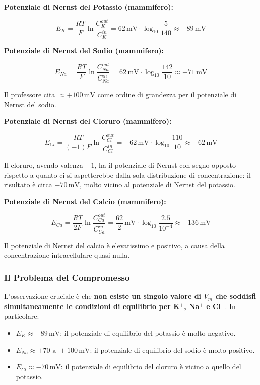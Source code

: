 \textbf{Potenziale di Nernst del Potassio (mammifero):}

\begin{equation}
E_K = \frac{RT}{F} \ln \frac{C_K^{out}}{C_K^{in}} = 62\,\text{mV} \cdot \log_{10}\frac{5}{140} \approx -89\,\text{mV}
\end{equation}

\textbf{Potenziale di Nernst del Sodio (mammifero):}

\begin{equation}
E_{Na} = \frac{RT}{F} \ln \frac{C_{Na}^{out}}{C_{Na}^{in}} = 62\,\text{mV} \cdot \log_{10}\frac{142}{10} \approx +71\,\text{mV}
\end{equation}

Il professore cita $\approx +100\,\text{mV}$ come ordine di grandezza per il potenziale di Nernst del sodio.

\textbf{Potenziale di Nernst del Cloruro (mammifero):}

\begin{equation}
E_{Cl} = \frac{RT}{(-1)F} \ln \frac{C_{Cl}^{out}}{C_{Cl}^{in}} = -62\,\text{mV} \cdot \log_{10}\frac{110}{10} \approx -62\,\text{mV}
\end{equation}

Il cloruro, avendo valenza $-1$, ha il potenziale di Nernst con segno opposto rispetto a quanto ci si aspetterebbe dalla sola distribuzione di concentrazione: il risultato è circa $-70\,\text{mV}$, molto vicino al potenziale di Nernst del potassio.

\textbf{Potenziale di Nernst del Calcio (mammifero):}

\begin{equation}
E_{Ca} = \frac{RT}{2F} \ln \frac{C_{Ca}^{out}}{C_{Ca}^{in}} = \frac{62}{2}\,\text{mV} \cdot \log_{10}\frac{2.5}{10^{-4}} \approx +136\,\text{mV}
\end{equation}

Il potenziale di Nernst del calcio è elevatissimo e positivo, a causa della concentrazione intracellulare quasi nulla.


\subsubsection{Il Problema del Compromesso}

L'osservazione cruciale è che \textbf{non esiste un singolo valore di $V_m$ che soddisfi simultaneamente le condizioni di equilibrio per K$^+$, Na$^+$ e Cl$^-$}. In particolare:

\begin{itemize}
    \item $E_K \approx -89\,\text{mV}$: il potenziale di equilibrio del potassio è molto negativo.
    \item $E_{Na} \approx +70\text{ a }+100\,\text{mV}$: il potenziale di equilibrio del sodio è molto positivo.
    \item $E_{Cl} \approx -70\,\text{mV}$: il potenziale di equilibrio del cloruro è vicino a quello del potassio.
\end{itemize}


